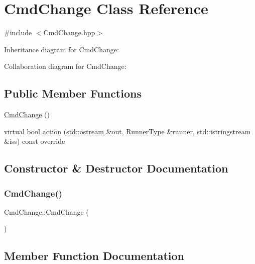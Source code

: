 \hypertarget{classCmdChange}{}\section{Cmd\+Change Class Reference}
\label{classCmdChange}


{\ttfamily \#include $<$Cmd\+Change.\+hpp$>$}



Inheritance diagram for Cmd\+Change\+:


Collaboration diagram for Cmd\+Change\+:
\subsection*{Public Member Functions}
\begin{DoxyCompactItemize}
\item 
\hyperlink{classCmdChange_a4fc728f5bac93453ad24311561bee975}{Cmd\+Change} ()
\item 
virtual bool \hyperlink{classCmdChange_a4c3bdb844bb270715716e21e20bb9c7f}{action} (\hyperlink{doctest_8h_a116af65cb5e924b33ad9d9ecd7a783f3}{std\+::ostream} \&out, \hyperlink{Command_8hpp_ad45c3de597c2023a8be0399d914161f4}{Runner\+Type} \&runner, std\+::istringstream \&iss) const override
\end{DoxyCompactItemize}


\subsection{Constructor \& Destructor Documentation}
\mbox{\label{classCmdChange_a4fc728f5bac93453ad24311561bee975}} 
\subsubsection{\texorpdfstring{Cmd\+Change()}{CmdChange()}}
{\footnotesize\ttfamily Cmd\+Change\+::\+Cmd\+Change (\begin{DoxyParamCaption}{ }\end{DoxyParamCaption})}



\subsection{Member Function Documentation}
\mbox{\label{classCmdChange_a4c3bdb844bb270715716e21e20bb9c7f}} 
